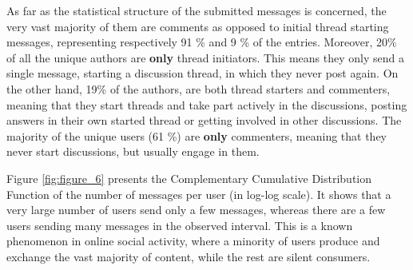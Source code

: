 \documentclass[runningheads]{llncs}
\begin{document}

As far as the statistical structure of the submitted messages is concerned, the very vast majority of them are comments as opposed to initial thread starting messages, representing respectively 91 \% and 9 \% of the entries. Moreover, 20\% of all the unique authors are \textbf{only} thread initiators. This means they only send a single message, starting a discussion thread, in which they never post again. On the other hand, 19\% of the authors, are both thread starters and commenters, meaning that they start threads and take part actively in the discussions, posting answers in their own started thread or getting involved in other discussions. The majority of the unique users (61 \%)  are \textbf{only} commenters, meaning that they never start discussions, but usually engage in them.

Figure \ref{fig:figure_6} presents the Complementary Cumulative Distribution Function of the number of messages per user (in log-log scale). It shows that a very large number of users send only a few messages, whereas there are a few users sending many messages in the observed interval. 
This is a known phenomenon in online social activity, where a minority of users produce and exchange the vast majority of content, while the rest are silent consumers.


\end{document}
